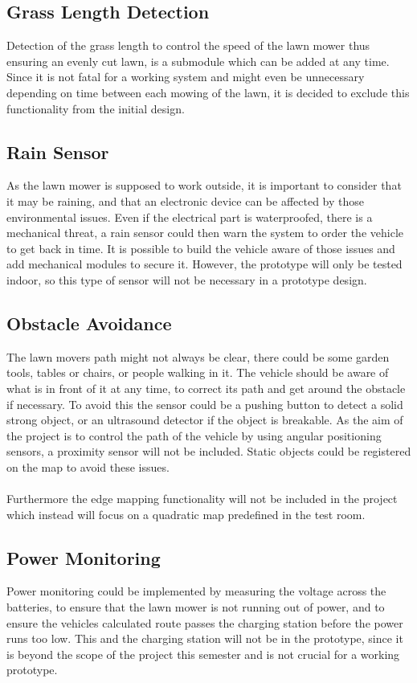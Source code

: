 \subsection{Grass Length Detection}
Detection of the grass length to control the speed of the lawn mower thus ensuring an evenly cut lawn, is a submodule which can be added at any time. Since it is not fatal for a working system and might even be unnecessary depending on time between each mowing of the lawn, it is decided to exclude this functionality from the initial design.

\subsection{Rain Sensor}
As the lawn mower is supposed to work outside, it is important to consider that it may be raining, and that an electronic device can be affected by those environmental issues. Even if the electrical part is waterproofed, there is a mechanical threat, a rain sensor could then warn the system to order the vehicle to get back in time.
It is possible to build the vehicle aware of those issues and add mechanical modules to secure it. However, the prototype will only be tested indoor, so this type of sensor will not be necessary in a prototype design.

\subsection{Obstacle Avoidance}
The lawn movers path might not always be clear, there could be some garden tools, tables or chairs, or people walking in it. The vehicle should be aware of what is in front of it at any time, to correct its path and get around the obstacle if necessary. To avoid this the sensor could be a pushing button to detect a solid strong object, or an ultrasound detector if the object is breakable.
As the aim of the project is to control the path of the vehicle by using angular positioning sensors, a proximity sensor will not be included. Static objects could be registered on the map to avoid these issues.\\\\
Furthermore the edge mapping functionality will not be included in the project which instead will focus on a quadratic map predefined in the test room.

\subsection{Power Monitoring}
Power monitoring could be implemented by measuring the voltage across the batteries, to ensure that the lawn mower is not running out of power, and to ensure the vehicles calculated route passes the charging station before the power runs too low.
This and the charging station will not be in the prototype, since it is beyond the scope of the project this semester and is not crucial for a working prototype.


